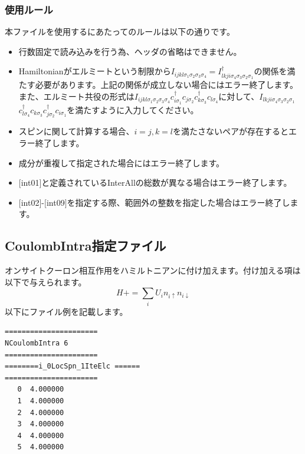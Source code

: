 \subsubsection{使用ルール}
本ファイルを使用するにあたってのルールは以下の通りです。
\begin{itemize}
\item 行数固定で読み込みを行う為、ヘッダの省略はできません。
\item Hamiltonianがエルミートという制限から$I_{ijkl\sigma_1\sigma_2\sigma_3\sigma_4}=I_{lkji\sigma_4\sigma_3\sigma_2\sigma_1}^{\dag}$の関係を満たす必要があります。上記の関係が成立しない場合にはエラー終了します。
また、エルミート共役の形式は$I_{ijkl\sigma_1\sigma_2\sigma_3\sigma_4}c_{i\sigma_1}^{\dagger}c_{j\sigma_2}c_{k\sigma_3}^{\dagger}c_{l\sigma_4}$に対して、$I_{lkji\sigma_4\sigma_3\sigma_2\sigma_1}$
$c_{l\sigma_4}^{\dagger}c_{k\sigma_3}c_{j\sigma_2}^{\dagger}c_{i\sigma_1}$を満たすように入力してください。
\item スピンに関して計算する場合、$i=j, k=l$を満たさないペアが存在するとエラー終了します。
\item 成分が重複して指定された場合にはエラー終了します。
\item $[$int01$]$と定義されているInterAllの総数が異なる場合はエラー終了します。
\item $[$int02$]$-$[$int09$]$を指定する際、範囲外の整数を指定した場合はエラー終了します。
\end{itemize}


\newpage
\subsection{CoulombIntra指定ファイル}
\label{Subsec:coulombintra}
オンサイトクーロン相互作用をハミルトニアンに付け加えます。付け加える項は以下で与えられます。
\begin{equation}
H+=\sum_{i}U_i n_ {i \uparrow}n_{i \downarrow}
\end{equation}
以下にファイル例を記載します。

\begin{minipage}{12.5cm}
\begin{screen}
\begin{verbatim}
====================== 
NCoulombIntra 6  
====================== 
========i_0LocSpn_1IteElc ====== 
====================== 
   0  4.000000
   1  4.000000
   2  4.000000
   3  4.000000
   4  4.000000
   5  4.000000
\end{verbatim}
\end{screen}
\end{minipage}

